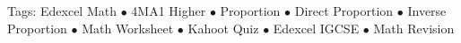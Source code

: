\documentclass[11pt,a4paper]{article}
\begin{document}
\vspace{14pt}
\begin{center}
  \sffamily\scriptsize\textcolor{textmuted}{
    Tags: Edexcel Math $\bullet$ 4MA1 Higher $\bullet$ Proportion $\bullet$ Direct Proportion $\bullet$ Inverse Proportion $\bullet$ Math Worksheet $\bullet$ Kahoot Quiz $\bullet$ Edexcel IGCSE $\bullet$ Math Revision
  }
\end{center}
\end{document}
